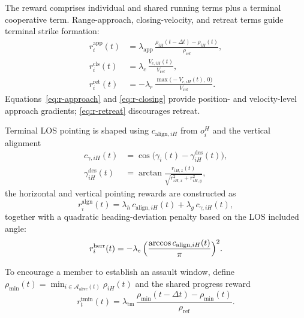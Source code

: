 \documentclass{cja}
\begin{document}
The reward comprises individual and shared running terms plus a terminal cooperative term. Range-approach, closing-velocity, and retreat terms guide terminal strike formation:
\begin{align}
r_i^{\mathrm{app}}(t)&=\lambda_{\mathrm{app}}\,\frac{\rho_{iH}(t-\Delta t)-\rho_{iH}(t)}{\rho_{\mathrm{ref}}},
\label{eq:r-approach}\\
r_i^{\mathrm{cls}}(t)&=\lambda_{c}\,\frac{V_{c,iH}(t)}{V_{\mathrm{ref}}},
\label{eq:r-closing}\\
r_i^{\mathrm{ret}}(t)&=-\lambda_r\,\frac{\max\bigl(-V_{c,iH}(t),\,0\bigr)}{V_{\mathrm{ref}}}.
\label{eq:r-retreat}
\end{align}
Equations~\eqref{eq:r-approach} and \eqref{eq:r-closing} provide position- and velocity-level approach gradients; \eqref{eq:r-retreat} discourages retreat.

Terminal LOS pointing is shaped using $c_{\mathrm{align},iH}$ from $o_i^{H}$ and the vertical alignment
\begin{equation}
\begin{aligned}
c_{\gamma,iH}(t)
&=\cos\!\bigl(\gamma_i(t)-\gamma_{iH}^{\mathrm{des}}(t)\bigr),\\
\gamma_{iH}^{\mathrm{des}}(t)
&=\arctan\!\frac{r_{iH,z}(t)}{\sqrt{r_{iH,x}^{2}+r_{iH,y}^{2}}},
\end{aligned}
\end{equation}
the horizontal and vertical pointing rewards are constructed as
\begin{equation}
r_i^{\mathrm{algn}}(t)=\lambda_h\,c_{\mathrm{align},iH}(t)+\lambda_g\,c_{\gamma,iH}(t),
\label{eq:r-align}
\end{equation}
together with a quadratic heading-deviation penalty based on the LOS included angle:
\begin{equation}
r_i^{\mathrm{herr}}(t)=-\lambda_e\,\Bigl(\dfrac{\arccos c_{\mathrm{align},iH}(t)}{\pi}\Bigr)^{2}.
\label{eq:r-herr}
\end{equation}

To encourage a member to establish an assault window, define $\rho_{\min}(t)=\min_{i\in\mathcal{A}_{\mathrm{alive}}(t)}\rho_{iH}(t)$ and the shared progress reward
\begin{equation}
r_t^{\mathrm{tmin}}(t)=\lambda_{\mathrm{tm}}\,\frac{\rho_{\min}(t-\Delta t)-\rho_{\min}(t)}{\rho_{\mathrm{ref}}}.
\label{eq:r-team}
\end{equation}
\end{document}
